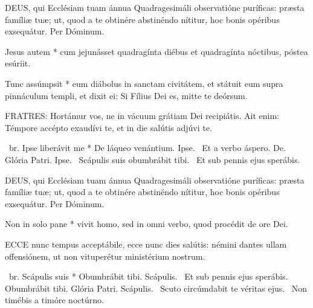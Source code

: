 \lettrine[lines=2]{D}{EUS}, qui Ecclésiam tuam ánnua Quadragesimáli observatióne puríficas: præsta famíliæ tuæ; ut, quod a te obtinére abstinéndo nítitur, hoc bonis opéribus exsequátur. Per Dóminum.


 Jesus autem * cum jejunásset quadragínta diébus et quadragínta nóctibus, póstea esúriit.



 Tunc assúmpsit * eum diábolus in sanctam civitátem, et státuit eum supra pinnáculum templi, et dixit ei: Si Fílius Dei es, mitte te deórsum.


\lettrine[lines=2]{F}{RATRES}: Hortámur vos, ne in vácuum grátiam Dei recipiátis. Ait enim: Témpore accépto exaudívi te, et in die salútis adjúvi te.

\R\ br. Ipse liberávit me * De láqueo venántium. Ipse. \V\ Et a verbo áspero. De. Glória Patri. Ipse. \V\ Scápulis suis obumbrábit tibi. \R\ Et sub pennis ejus sperábis.


\lettrine[lines=2]{D}{EUS}, qui Ecclésiam tuam ánnua Quadragesimáli observatióne puríficas: præsta famíliæ tuæ; ut, quod a te obtinére abstinéndo nítitur, hoc bonis opéribus exsequátur. Per Dóminum.


 Non in solo pane * vivit homo, sed in omni verbo, quod procédit de ore Dei.


\lettrine[lines=2]{E}{CCE} nunc tempus acceptábile, ecce nunc dies salútis: némini dantes ullam offensiónem, ut non vituperétur ministérium nostrum.

\R\ br. Scápulis suis * Obumbrábit tibi. Scápulis. \V\ Et sub pennis ejus sperábis. Obumbrábit tibi. Glória Patri. Scápulis. \V\ Scuto circúmdabit te véritas ejus. \R\ Non timébis a timóre noctúrno.

